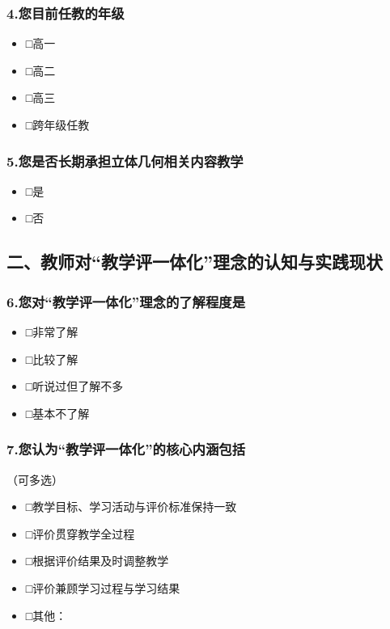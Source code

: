 \documentclass[UTF8,a4paper,12pt,twoside]{ctexart}
\begin{document}
\subsubsection*{4.您目前任教的年级}
\begin{itemize}
\item □高一
\item □高二
\item □高三
\item □跨年级任教
\end{itemize}

\subsubsection*{5.您是否长期承担立体几何相关内容教学}
\begin{itemize}
\item □是
\item □否
\end{itemize}

\subsection*{二、教师对“教学评一体化”理念的认知与实践现状}

\subsubsection*{6.您对“教学评一体化”理念的了解程度是}
\begin{itemize}
\item □非常了解
\item □比较了解
\item □听说过但了解不多
\item □基本不了解
\end{itemize}

\subsubsection*{7.您认为“教学评一体化”的核心内涵包括}
（可多选）
\begin{itemize}
\item □教学目标、学习活动与评价标准保持一致
\item □评价贯穿教学全过程
\item □根据评价结果及时调整教学
\item □评价兼顾学习过程与学习结果
\item □其他：\underline{\hspace{2cm}}
\end{itemize}
\end{document}
